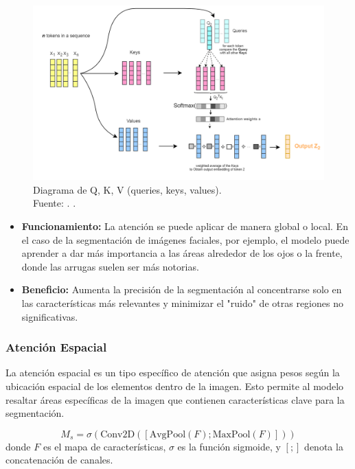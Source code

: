 \begin{figure}[H]
	\begin{center}
		\includegraphics[width=1\textwidth]{2/figures/eqbasmat.png}
		\caption[Diagrama de Q, K, V (queries, keys, values)]{Diagrama de Q, K, V (queries, keys, values).\\
		Fuente: \cite{vaswani2025transformers}. .}
		\label{2:figeqbasmat}
	\end{center}
\end{figure}

\begin{itemize}
    \item \textbf{Funcionamiento:} La atención se puede aplicar de manera global o local. En el caso de la segmentación de imágenes faciales, por ejemplo, el modelo puede aprender a dar más importancia a las áreas alrededor de los ojos o la frente, donde las arrugas suelen ser más notorias.
    \item \textbf{Beneficio:} Aumenta la precisión de la segmentación al concentrarse solo en las características más relevantes y minimizar el "ruido" de otras regiones no significativas. \parencite{autor2021atencion}
\end{itemize}

\subsubsection{Atención Espacial}  
La atención espacial es un tipo específico de atención que asigna pesos según la ubicación espacial de los elementos dentro de la imagen. Esto permite al modelo resaltar áreas específicas de la imagen que contienen características clave para la segmentación.  

\begin{equation}\label{eq:mapa_atencion_espacial}
    M_s = \sigma(\text{Conv2D}([\text{AvgPool}(F); \text{MaxPool}(F)]))
\end{equation}
donde $F$ es el mapa de características, $\sigma$ es la función sigmoide, y $[;]$ denota la concatenación de canales.



